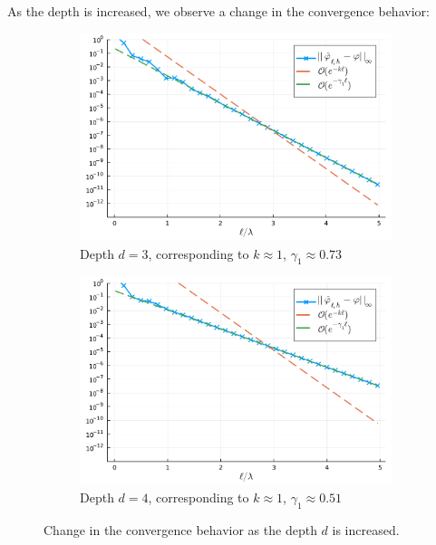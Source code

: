 \documentclass[11pt]{article}
\begin{document}
As the depth is increased, we observe a change in the convergence behavior:

\begin{figure}
  \centering
  \begin{subfigure}{0.49\linewidth}
    \includegraphics[width=\textwidth]{figures/convergence_pml_planewave_depth_3.pdf}
    \caption{Depth $d=3$, corresponding to $k \approx 1$, $\gamma_1 \approx 0.73$}
    \label{fig:convergence-modal-solution-depth-3}
  \end{subfigure}
  \begin{subfigure}{0.49\linewidth}
    \includegraphics[width=1\textwidth]{figures/convergence_pml_planewave_depth_4.pdf}
    \caption{Depth $d=4$, corresponding to $k \approx 1$, $\gamma_1 \approx 0.51$}
    \label{fig:convergence-modal-solution-depth-4}
  \end{subfigure}
  \label{fig:convergence-modal-solution}
  \caption{Change in the convergence behavior as the depth $d$ is increased.}
\end{figure}
\end{document}
